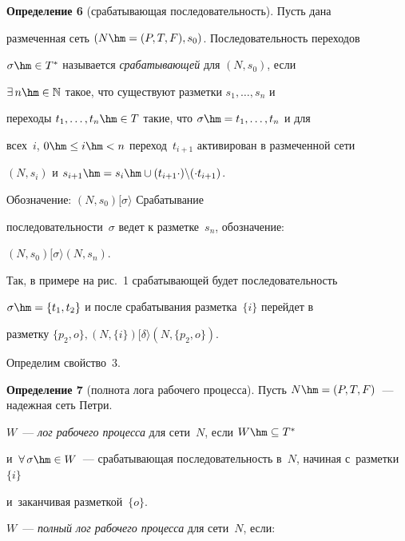   

  \noindent

  \textbf{Определение 6} (срабатывающая последовательность). Пусть дана 

размеченная сеть $(N\hm= (P,T,F), s_0)$. Последовательность переходов 

$\sigma\hm\in T^*$ называется \textit{срабатывающей} для $(N,s_0)$, если 

$\exists\,n\hm\in \mathbb{N}$ такое, что существуют разметки $s_1,\ldots , s_n$ и 

переходы $t_1, \ldots , t_n\hm\in T$ такие, что $\sigma\hm= t_1, \ldots , t_n$ и для 

всех~$i$, $0\hm\leq i\hm< n$ переход~$t_{i+1}$ активирован в размеченной сети 

$(N, s_i)$ и $s_{i+1}\hm= s_i\hm\cup (t_{i+1}\cdot )\backslash (\cdot t_{i+1})$. 

Обозначение:  $(N, s_0)[\sigma\rangle$ Срабатывание 

последовательности~$\sigma$ ведет к разметке~$s_n$, обозначение: 

$(N,s_0)[\sigma\rangle (N,s_n)$.

  

  Так, в примере на рис.~1 срабатывающей будет последовательность 

$\sigma\hm=\{t_1, t_2\}$ и после срабатывания разметка~$\{i\}$ перейдет в 

разметку $\{p_2,o\}, (N,\{i\})[\delta\rangle (N,\{p_2,o\})$.

  

  Определим свойство~3.

  

  \smallskip

  

  \noindent

  \textbf{Определение 7} (полнота лога рабочего процесса). Пусть $N\hm= 

(P,T,F)$~--- надежная сеть Петри.  

$W$~---  \textit{лог рабочего процесса} для сети~$N$, если $W\hm\subseteq T^*$ 

и~$\forall\,\sigma\hm\in  

W$~---  срабатывающая последовательность в~$N$, начиная с~разметки~$\{i\}$ 

и~заканчивая разметкой~$\{o\}$.  

$W$~--- \textit{полный лог рабочего процесса} для сети~$N$, если:

